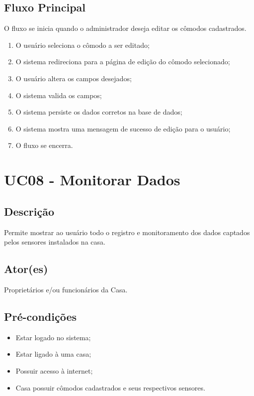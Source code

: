 \begin{anexosenv}
    \subsection{Fluxo Principal}
        O fluxo se inicia quando o administrador deseja editar os cômodos cadastrados.
        \begin{enumerate}
            \item O usuário seleciona o cômodo a ser editado;
            \item O sistema redireciona para a página de edição do cômodo selecionado;
            \item O usuário altera os campos desejados;
            \item O sistema valida os campos;
            \item O sistema persiste os dados corretos na base de dados;
            \item O sistema mostra uma mensagem de sucesso de edição para o usuário;
            \item O fluxo se encerra.
        \end{enumerate}

\section{UC08 \-- Monitorar Dados}
    \subsection{Descrição}
        Permite mostrar ao usuário todo o registro e monitoramento dos dados captados pelos sensores instalados na casa.
    \subsection{Ator(es)}
        Proprietários e/ou funcionários da Casa.
    \subsection{Pré-condições}
        \begin{itemize}
            \item Estar logado no sistema;
            \item Estar ligado à uma casa;
            \item Possuir acesso à internet;
            \item Casa possuir cômodos cadastrados e seus respectivos sensores.
        \end{itemize}

\end{anexosenv}
